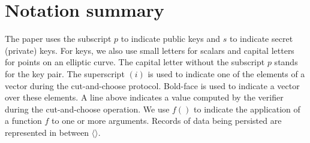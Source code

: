 \documentclass[sigconf, authordraft]{acmart}
\begin{document}


\newpage
\appendix

\section{Notation summary} \label{sec:notation}

The paper uses the subscript $p$ to indicate public keys and $s$ to
indicate secret (private) keys.  For keys, we also use small letters
for scalars and capital letters for points on an elliptic curve.  The
capital letter without the subscript $p$ stands for the key pair.  The
superscript $(i)$ is used to indicate one of the elements of a vector
during the cut-and-choose protocol.  Bold-face is used to indicate a
vector over these elements.  A line above indicates a value computed
by the verifier during the cut-and-choose operation.  We use $f()$ to
indicate the application of a function $f$ to one or more arguments. Records of
data being persisted are represented in between $\langle\rangle$.
\end{document}
